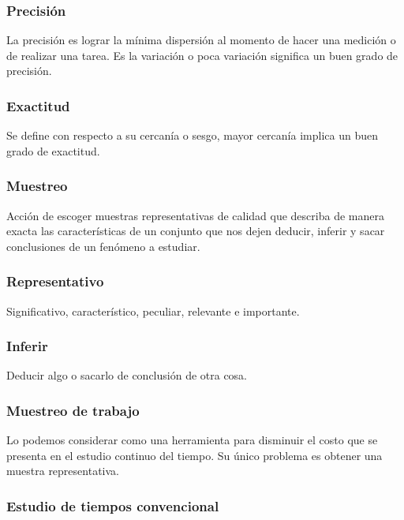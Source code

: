 \subsubsection{Precisión}

La precisión es lograr la mínima dispersión al momento de hacer una medición o de realizar una tarea. Es la variación o poca variación significa un buen grado de precisión.

\subsubsection{Exactitud}

Se define con respecto a su cercanía o sesgo, mayor cercanía implica un buen grado de exactitud.

\subsubsection{Muestreo}

Acción de escoger muestras representativas de calidad que describa de manera exacta las características de un conjunto que nos dejen deducir, inferir y sacar conclusiones de un fenómeno a estudiar. \cite{RAE}

\subsubsection{Representativo}

Significativo, característico, peculiar, relevante e importante. \cite{RAE}

\subsubsection{Inferir}

Deducir algo o sacarlo de conclusión de otra cosa.\cite{RAE}

\subsubsection{Muestreo de trabajo}

Lo podemos considerar como una herramienta para disminuir el costo que se presenta  en el estudio continuo del tiempo. Su único problema es obtener una muestra representativa.

\subsubsection{Estudio de tiempos convencional}

